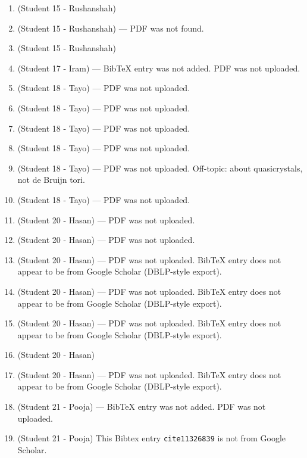\begin{enumerate}[label=\#\arabic*]
\item \cite{farsangi2021rectification} (Student 15 - Rushanshah)
\item \cite{griffin1992generation} (Student 15 - Rushanshah) --- PDF was not found.
\item \cite{maurice2011pattern} (Student 15 - Rushanshah)
\item \cite{vyahhi2012bruijn} (Student 17 - Iram) --- BibTeX entry was not added. PDF was not uploaded.
\item \cite{bernad2023data} (Student 18 - Tayo) --- PDF was not uploaded.
\item \cite{adamson2023k} (Student 18 - Tayo) --- PDF was not uploaded.
\item \cite{rockey2014compactly} (Student 18 - Tayo) --- PDF was not uploaded.
\item \cite{you20256} (Student 18 - Tayo) --- PDF was not uploaded.
\item \cite{engel2008stability} (Student 18 - Tayo) --- PDF was not uploaded. Off-topic: about quasicrystals, not de Bruijn tori.
\item \cite{elishco2021repeat} (Student 18 - Tayo) --- PDF was not uploaded.
\item \cite{fredricksen1982survey} (Student 20 - Hasan) --- PDF was not uploaded.
\item \cite{martin1934problem} (Student 20 - Hasan) --- PDF was not uploaded.
\item \cite{mitchell1994constructing} (Student 20 - Hasan) --- PDF was not uploaded. BibTeX entry does not appear to be from Google Scholar (DBLP-style export).
\item \cite{hsieh2001decoding} (Student 20 - Hasan) --- PDF was not uploaded. BibTeX entry does not appear to be from Google Scholar (DBLP-style export).
\item \cite{wei2022nearly} (Student 20 - Hasan) --- PDF was not uploaded. BibTeX entry does not appear to be from Google Scholar (DBLP-style export).
\item \cite{kim2005generalized} (Student 20 - Hasan)
\item \cite{fan1989constructions} (Student 20 - Hasan) --- PDF was not uploaded. BibTeX entry does not appear to be from Google Scholar (DBLP-style export).
\item \cite{peng2024generation} (Student 21 - Pooja) --- BibTeX entry was not added. PDF was not uploaded.
\item \cite{11326839} (Student 21 - Pooja)
This Bibtex entry \texttt{cite{11326839}} is not from Google Scholar.

\end{enumerate}
